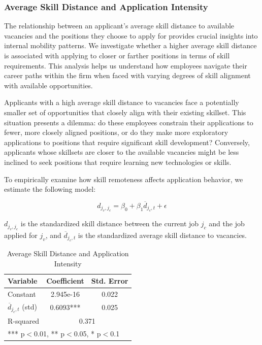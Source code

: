 \subsubsection{Average Skill Distance and Application Intensity}

The relationship between an applicant's average skill distance to available vacancies and the positions they choose to 
apply for provides crucial insights into internal mobility patterns. We investigate whether a higher average skill 
distance is associated with applying to closer or farther positions in terms of skill requirements. This analysis 
helps us understand how employees navigate their career paths within the firm when faced with varying degrees of skill 
alignment with available opportunities.

Applicants with a high average skill distance to vacancies face a potentially smaller set of opportunities that closely 
align with their existing skillset. This situation presents a dilemma: do these employees constrain their applications 
to fewer, more closely aligned positions, or do they make more exploratory applications to positions that require 
significant skill development? Conversely, applicants whose skillsets are closer to the available vacancies might 
be less inclined to seek positions that require learning new technologies or skills.

To empirically examine how skill remoteness affects application behavior, we estimate the following model:

\begin{equation}
    d_{j_v, j_c} = \beta_0 + \beta_1 \overline{d}_{j_c, t} + \epsilon
\end{equation}

$d_{j_v, j_c}$ is the standardized skill distance between the current job $j_c$ and the job applied for $j_v$, 
and $\overline{d}_{j_c, t}$ is the standardized average skill distance to vacancies.


\begin{table}[h]
\centering
\caption{Average Skill Distance and Application Intensity} 
\renewcommand{\arraystretch}{1.2}
\begin{tabular}{lcc}
\hline
\textbf{Variable} & \textbf{Coefficient} & \textbf{Std. Error} \\
\hline
Constant & 2.945e-16 & 0.022 \\
$\overline{d}_{j_c, t}$ (std) & 0.6093*** & 0.025 \\
\hline
R-squared & \multicolumn{2}{c}{0.371} \\
\hline
\multicolumn{3}{l}{*** p$<$0.01, ** p$<$0.05, * p$<$0.1} \\
\end{tabular}
\label{tab:skill_remote_app}
\end{table}

